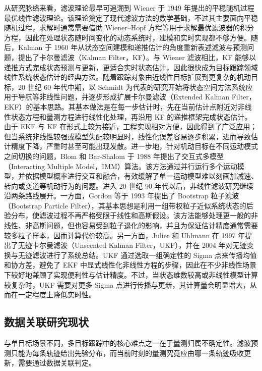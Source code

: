 \documentclass{xdupgthesis}
\begin{document}
从研究脉络来看，滤波理论最早可追溯到 Wiener 于 1949 年提出的平稳随机过程最优线性滤波理论\cite{wiener1949extrapolation}。该理论奠定了现代滤波方法的数学基础，不过其主要面向平稳随机过程，求解时通常需要借助 Wiener--Hopf 方程等用于求解最优滤波器的积分方程，因此在处理状态随时间变化的动态系统时，建模和实时实现都不够方便。随后，Kalman 于 1960 年从状态空间建模和递推估计的角度重新表述滤波与预测问题，提出了卡尔曼滤波（Kalman Filter，KF）\cite{kalman1960linearfiltering}。与 Wiener 滤波相比，KF 能够以递推方式完成状态预测与更新，更适合实时状态估计，因此很快成为目标跟踪领域线性系统状态估计的经典方法。随着跟踪对象由近线性目标扩展到更复杂的机动目标，20 世纪 60 年代中期，以 Schmidt 为代表的研究开始将状态空间方法系统应用于导航等非线性问题，并逐步形成扩展卡尔曼滤波（Extended Kalman Filter，EKF）的基本思路\cite{schmidt1966statespace}。其基本做法是在每一步估计时，先在当前估计点附近对非线性状态方程和量测方程进行线性化处理，再沿用 KF 的递推框架完成状态估计。由于 EKF 与 KF 在形式上较为接近，工程实现相对方便，因此得到了广泛应用；但当系统非线性较强或模型失配较明显时，线性化误差容易逐步积累，进而导致估计精度下降，严重时甚至可能出现发散。进一步地，针对机动目标在不同运动模式之间切换的问题，Blom 和 Bar-Shalom 于 1988 年提出了交互式多模型（Interacting Multiple Model，IMM）算法\cite{blom1988imm}。该方法通过并行运行多个运动模型，并依据模型概率进行交互和融合，有效缓解了单一运动模型难以刻画加减速、转向或变道等机动行为的问题。进入 20 世纪 90 年代以后，非线性滤波研究继续沿两条路线展开。一方面，Gordon 等于 1993 年提出了 Bootstrap 粒子滤波（Bootstrap Particle Filter），其基本思想是利用一组带权粒子近似系统状态的后验分布，使滤波过程不再严格受限于线性和高斯假设\cite{gordon1993bootstrap}。该方法能够处理更一般的非线性、非高斯问题，但也容易受到粒子退化的影响，并且为保证估计精度通常需要较多粒子样本，因而计算代价较高。另一方面，Julier 和 Uhlmann 在 1997 年提出了无迹卡尔曼滤波（Unscented Kalman Filter，UKF），并在 2004 年对无迹变换与无迹滤波进行了系统总结\cite{julier1997ukf,julier2004unscented}。UKF 通过选取一组确定性的 Sigma 点来传播均值和协方差，避免了 EKF 中显式线性化非线性方程的步骤，因此在不少非线性场景下较好地兼顾了实现便利性与估计精度。不过，当状态维数较高或非线性模型计算较复杂时，UKF 需要对更多 Sigma 点进行传播与更新，其计算量会明显增大，从而在一定程度上降低实时性。


\subsection{数据关联研究现状}
与单目标场景不同，多目标跟踪中的核心难点之一在于量测归属不确定性。滤波预测只能为每条轨迹给出先验分布，而当前时刻的量测究竟应由哪一条轨迹吸收更新，需要通过数据关联判定\cite{barshalomli1995multitarget}。
\end{document}
